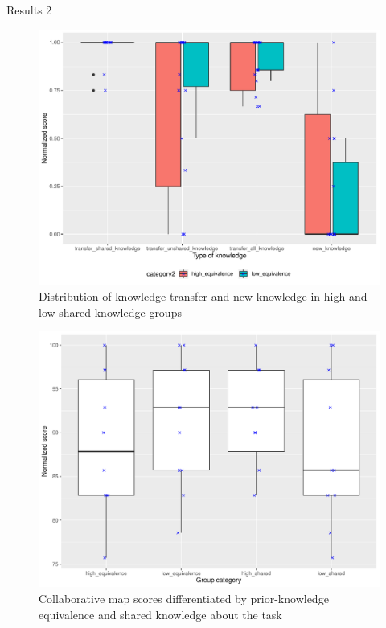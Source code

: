 \begin{frame}[allowframebreaks]{Results 2}
    \begin{figure}[tb]
     \begin{center}
      \includegraphics[width=120mm]{images/rqb_dist-equivalence-all-redraw.pdf}
      \end{center}
      \caption{Distribution of knowledge transfer and new knowledge in high-and low-shared-knowledge groups}
      \label{rqb::dist_shared}  
    \end{figure}
    
    \begin{figure}[tb]
     \begin{center}
      \includegraphics[width=120mm]{images/rqb_group-map-redraw.pdf}
      \end{center}
      \caption{Collaborative map scores differentiated by prior-knowledge 
      equivalence and shared knowledge about the task}
      \label{group-map}  
    \end{figure}
\end{frame}

